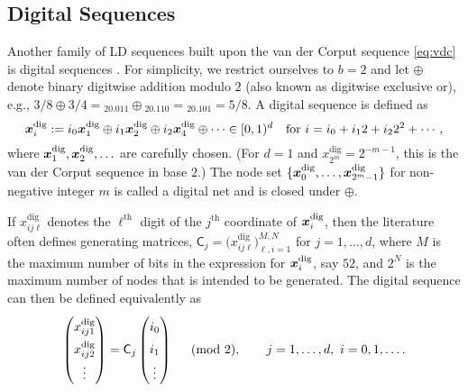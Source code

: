 \documentclass{svproc}
\begin{document}

\subsection{Digital Sequences} \label{sec:digital}

Another family of LD sequences built upon the van der Corput sequence \eqref{eq:vdc} is digital sequences \cite{DicPil10a,Nie92}.  For simplicity, we restrict ourselves to $b = 2$ and let $\oplus$ denote binary digitwise addition modulo $2$ (also known as digitwise exclusive or), e.g., $3/8 \oplus 3/4 = {}_20.011 \oplus {}_20.110 = {}_20.101 = 5/8$.  A digital sequence is defined as
\begin{equation} \label{eq:digital}
	{\boldsymbol{x}}_i^{\text{dig}} := i_0 {\boldsymbol{x}}^{\text{dig}} _1 \oplus i_1 {\boldsymbol{x}}^{\text{dig}}_2 \oplus i_2 {\boldsymbol{x}}^{\text{dig}} _4 \oplus \cdots \in [0,1)^d \quad \text{for }
	i = i_0 + i_12 + i_2 2^2 + \cdots,
\end{equation}
where ${\boldsymbol{x}}^{\text{dig}}_1, {\boldsymbol{x}}^{\text{dig}}_2, \ldots$ are carefully chosen.  (For $d=1$ and $x^{\text{dig}}_{2^m} = 2^{-m-1}$, this is the van  der Corput sequence in base $2$.) The node set $\{ {\boldsymbol{x}}^{\text{dig}}_0, \ldots, {\boldsymbol{x}}^{\text{dig}}_{2^m-1}\}$  for non-negative integer $m$ is called a digital net and is closed under $\oplus$.

If $x^{\text{dig}}_{ij\ell}$ denotes the $\ell^{\text{th}}$ digit of the $j^{\text{th}}$ coordinate of ${\boldsymbol{x}}^{\text{dig}}_i$, then the literature often defines generating matrices, $\mathsf{C}_j = \bigl(x^{\text{dig}}_{ij\ell}\bigr)_{\ell,i = 1}^{M,N}$ for $j = 1, \ldots, d$, where $M$ is the maximum number of bits in the expression for ${\boldsymbol{x}}^{\text{dig}}_i$, say $52$, and $2^N$ is the maximum number of nodes that is intended to be generated.  The digital sequence can then be defined equivalently as
\begin{equation} \label{eq:digitalB}
\renewcommand{\arraystretch}{1.5}
	\begin{pmatrix} x^{\text{dig}}_{ij1} \\ x^{\text{dig}}_{ij2} \\ \vdots \end{pmatrix}
	= \mathsf{C}_j \begin{pmatrix} i_0 \\ i_1 \\ \vdots \end{pmatrix} \quad \pmod{2}, \qquad j = 1,\ldots, d, \ i = 0, 1, \ldots.
\end{equation}
\end{document}
